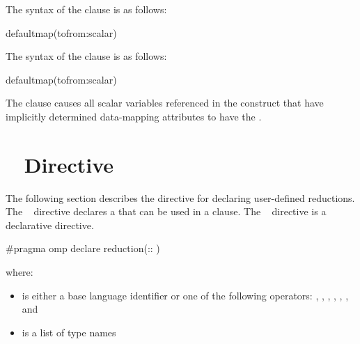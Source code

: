 {{{{\syntax
\ccppspecificstart
The syntax of the  clause is as follows:

\begin{boxedcode}
defaultmap(tofrom:scalar)
\end{boxedcode}
\ccppspecificend

\fortranspecificstart
The syntax of the  clause is as follows:

\begin{boxedcode}
defaultmap(tofrom:scalar)
\end{boxedcode}
\fortranspecificend

\descr
The  clause causes all scalar variables
referenced in the construct that have implicitly determined data-mapping
attributes to have the  .








\section{~ Directive}
\label{sec:declare reduction Directive}
\summary
The following section describes the directive for declaring user-defined reductions. The 
~ directive declares a  that can be used in a 
 clause. The ~ directive is a declarative directive.

\syntax
\cspecificstart
\begin{boxedcode}
\#pragma omp declare reduction(:: 
)
\end{boxedcode}

where:

\begin{itemize}

\item {} is either a base language identifier or one of the following 
operators: 
\code{+}, 
\code{-}, 
\code{*}, 
\code{\&}, 
\code{|}, 
\code{\^}, 
\code{\&\&} and 
\code{||} 

\item {} is a list of type names 


\end{itemize}}}}}
